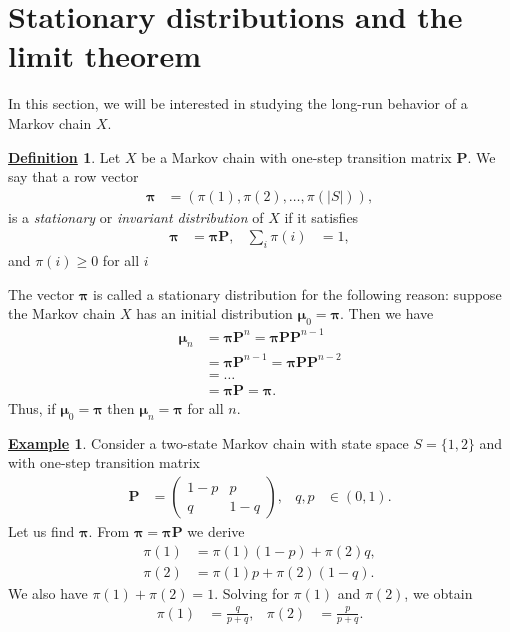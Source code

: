 \documentclass[12pt]{book}
\numberwithin{equation}{chapter}
\theoremstyle{plain}
\numberwithin{theorem}{section}
\theoremstyle{definition}
\newtheorem{definition}[theorem]{\underline{Definition}}
\newtheorem{example}[theorem]{\underline{Example}}
\numberwithin{exercise}{chapter}
\newcommand{\<}{\langle}
\renewcommand{\>}{\rangle}
\renewcommand{\(}{\left(}
\renewcommand{\)}{\right)}
\renewcommand{\[}{\left[}
\renewcommand{\]}{\right]}
\newcommand\Pv{\pmb{P}}
\newcommand\muv{\pmb{\mu}}
\newcommand\piv{\pmb{\pi}}
\begin{document}

\section{Stationary distributions and the limit theorem}
\label{sec:stationary}
In this section, we will be interested in studying the long-run behavior of a Markov chain $X$.

\begin{definition}
Let $X$ be a Markov chain with one-step transition matrix $\Pv$.  We say that a row vector
\begin{align}
\piv
	&=	( \pi(1), \pi(2), \ldots , \pi(|S|) ) ,
\end{align}
is a \emph{stationary} or \emph{invariant distribution} of $X$ if it satisfies
\begin{align}
\piv 
	&=	\piv \Pv , &
\sum_i \pi(i)
	&=	1 , 
\end{align}
and $\pi(i) \geq 0$ for all $i$
\end{definition}

\noindent
The vector $\piv$ is called a stationary distribution for the following reason:
suppose the Markov chain $X$ has an initial distribution $\muv_0 = \piv$.  Then we have
\begin{align}
\muv_n
	&=	\piv \Pv^n 
	=		\piv \Pv \Pv^{n-1} \\
	&=	\piv \Pv^{n-1} 
	=		\piv \Pv \Pv^{n-2} \\
	&=	\ldots \\
	&=	\piv \Pv
	=		\piv .
\end{align}
Thus, if $\muv_0 = \piv$ then $\muv_n = \piv$ for all $n$.

\begin{example}
Consider a two-state Markov chain with state space $S = \{ 1, 2 \}$ and with one-step transition matrix
\begin{align}
\Pv
	&=	\( \begin{array}{cc}
			1-p & p \\
			q & 1-q
			\end{array} \) , &
q, p
	&\in (0,1) .
\end{align}
Let us find $\piv$.  From $\piv = \piv \Pv$ we derive
\begin{align}
\pi(1)
	&=	\pi(1) (1-p) + \pi(2) q , \\
\pi(2)
	&=	\pi(1) p + \pi(2) (1-q) .
\end{align}
We also have $\pi(1) + \pi(2) = 1$.  Solving for $\pi(1)$ and $\pi(2)$, we obtain
\begin{align}
\pi(1)
	&=	\frac{q}{p+q} , &
\pi(2)
	&=	\frac{p}{p+q} .
\end{align}
\end{example}
\end{document}
